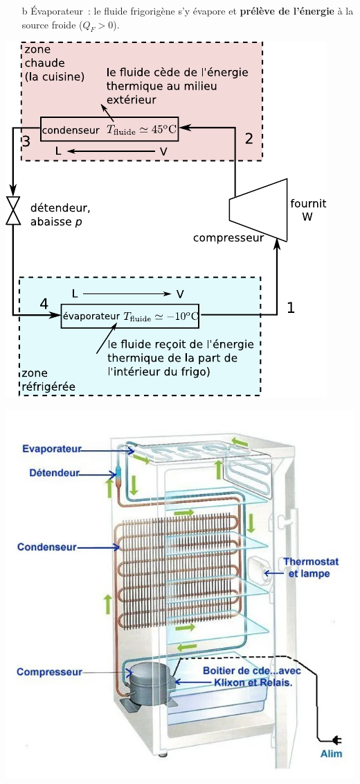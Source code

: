 \documentclass[../../main/main.tex]{subfiles}
\begin{document}
\begin{tcb}
\begin{isd}
\begin{enumerate}[start=3]
			\item[b]{Évaporateur}~: le fluide frigorigène s'y évapore et
			\textbf{prélève de l'énergie} à la source froide ($Q_F > 0$).
		\end{enumerate}
	\end{isd}
	\begin{isd}
		\begin{center}
			\includegraphics[width=.8\linewidth]{frigo_schema}
		\end{center}
		\tcblower
		\begin{center}
			\includegraphics[width=.9\linewidth]{frigo_schema_reel-2}
		\end{center}
	\end{isd}
\end{tcb}
\end{document}
